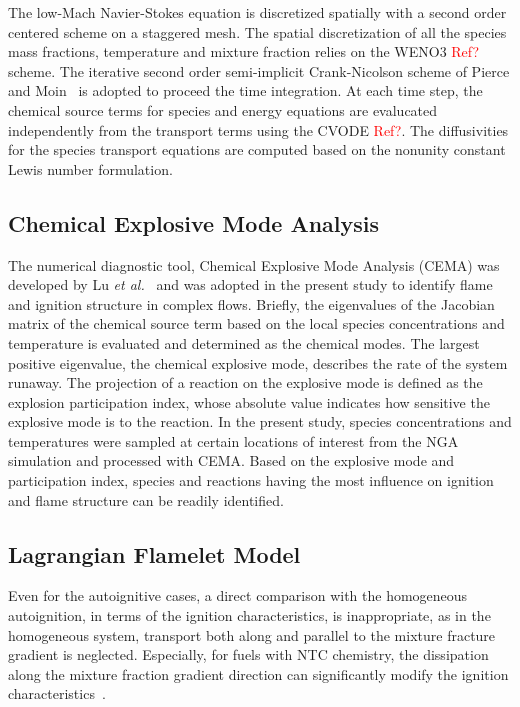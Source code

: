 \documentclass[review,3p,times]{elsarticleUS}
\begin{document}
The low-Mach Navier-Stokes equation is discretized spatially with a second order centered scheme on a staggered mesh.  The spatial discretization of all the species mass fractions, temperature and mixture fraction relies on the WENO3 \textcolor{red}{Ref?} scheme.  The iterative second order semi-implicit Crank-Nicolson scheme of Pierce and Moin~\cite{pierce01} is adopted to proceed the time integration.  At each time step, the chemical source terms for species and energy equations are evalucated independently from the transport terms using the CVODE \textcolor{red}{Ref?}.  The diffusivities for the species transport equations are computed based on the nonunity constant Lewis number formulation.  

\subsection{Chemical Explosive Mode Analysis}

The numerical diagnostic tool, Chemical Explosive Mode Analysis (CEMA) was developed by Lu \emph{et al.}~\cite{lu10} and was adopted in the present study to identify flame and ignition structure in complex flows.  Briefly, the eigenvalues of the Jacobian matrix of the chemical source term based on the local species concentrations and temperature is evaluated and determined as the chemical modes.  The largest positive eigenvalue, the chemical explosive mode, describes the rate of the system runaway.  The projection of a reaction on the explosive mode is defined as the explosion participation index, whose absolute value indicates how sensitive the explosive mode is to the reaction.  In the present study, species concentrations and temperatures were sampled at certain locations of interest from the NGA simulation and processed with CEMA.  Based on the explosive mode and participation index, species and reactions having the most influence on ignition and flame structure can be readily identified.

\subsection{Lagrangian Flamelet Model}

Even for the autoignitive cases, a direct comparison with the homogeneous autoignition, in terms of the ignition characteristics, is inappropriate, as in the homogeneous system, transport both along and parallel to the mixture fracture gradient is neglected.  Especially, for fuels with NTC chemistry, the dissipation along the mixture fraction gradient direction can significantly modify the ignition characteristics~\cite{law12,deng14}.      
\end{document}
